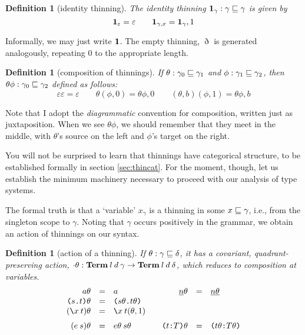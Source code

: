 \documentclass{jfp1}
\newtheorem{definition}[theorem]{Definition}
\newcommand{\emp}{\varepsilon}
\newcommand{\Pa}[1]{\texttt{(}#1\texttt{)}}
\newcommand{\dt}{\texttt{.}}
\newcommand{\cn}[2]{\Pa{#1 \dt #2}}
\newcommand{\hb}{\texttt{:}}
\newcommand{\ra}[2]{\Pa{#1 \hb #2}}
\newcommand{\Ne}{\underline}
\begin{document}
\begin{definition}[identity thinning]
The identity thinning $\mathbf{1}_\gamma : \gamma \sqsubseteq \gamma$ is given by
\[
  \ith_\emp = \emp \qquad \ith_{\gamma,x} = \ith_\gamma,1
\]
\end{definition}
Informally, we may just write $\mathbf{1}$. The empty thinning, $\eth$ is generated analogously, repeating
0 to the appropriate length.

\begin{definition}[composition of thinnings]
  If $\theta:\gamma_0\sqsubseteq \gamma_1$ and $\phi:\gamma_1\sqsubseteq\gamma_2$, then $\theta\phi : \gamma_0\sqsubseteq\gamma_2$
  defined as follows:
  \[
    \emp\emp = \emp \qquad
    \theta(\phi,0) = \theta\phi,0 \qquad
    (\theta,b)(\phi,1) = \theta\phi,b
  \]
\end{definition}
Note that I adopt the \emph{diagrammatic} convention for composition,
written just as juxtaposition. When we see $\theta\phi$, we should
remember that they meet in the middle, with $\theta$'s source on
the left and $\phi$'s target on the right.

You will not be surprised to learn that thinnings have categorical
structure, to be established formally in section \ref{sec:thincat}.
For the moment, though, let us establish the minimum machinery
necessary to proceed with our analysis of type systems.

The formal truth is that a `variable' $x_\gamma$ is a thinning
in some $x \sqsubseteq \gamma$, i.e., from the singleton scope to $\gamma$. Noting that $\gamma$ occurs
positively in the grammar, we obtain an action of thinnings on our syntax.

\begin{definition}[action of a thinning]
  If $\theta:\gamma\sqsubseteq \delta$, it has a covariant, quadrant-preserving action,
  $\cdot\theta:\mathbf{Term}\:l\:d\:\gamma\to\mathbf{Term}\:l\:d\:\delta$,
  which reduces to composition at variables.
  \[
    \begin{array}{rcl@{\qquad}rcl}
      a\theta & = & a & \Ne n\theta & = & \Ne{n\theta} \\
      \cn st\theta & = & \cn{s\theta}{t\theta} && \\
      (\la x t)\theta & = & \la x t(\theta,1) && \medskip\\
      (e\:s)\theta & = & e\theta\:s\theta & \ra tT\theta & = & \ra{t\theta}{T\theta} \\
    \end{array}
    \]
  \end{definition}
\end{document}
